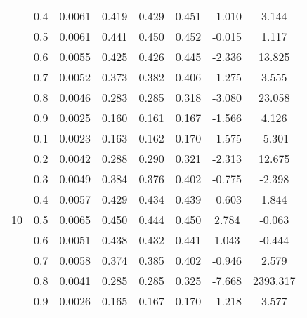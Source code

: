 \documentclass[11pt,a4paper]{report}
\begin{document}
\begin{longtable}{ | c | c || c | c | c | c | c | c | }
 & 0.4 & 0.0061 & 0.419 & 0.429 & 0.451 & -1.010 & 3.144 \\
 & 0.5 & 0.0061 & 0.441 & 0.450 & 0.452 & -0.015 & 1.117 \\
 & 0.6 & 0.0055 & 0.425 & 0.426 & 0.445 & -2.336 & 13.825 \\
 & 0.7 & 0.0052 & 0.373 & 0.382 & 0.406 & -1.275 & 3.555 \\
 & 0.8 & 0.0046 & 0.283 & 0.285 & 0.318 & -3.080 & 23.058 \\
 & 0.9 & 0.0025 & 0.160 & 0.161 & 0.167 & -1.566 & 4.126 \\
 \hline
\multirow{9}{*}{10} & 0.1 & 0.0023 & 0.163 & 0.162 & 0.170 & -1.575 & -5.301 \\
 & 0.2 & 0.0042 & 0.288 & 0.290 & 0.321 & -2.313 & 12.675 \\
 & 0.3 & 0.0049 & 0.384 & 0.376 & 0.402 & -0.775 & -2.398 \\
 & 0.4 & 0.0057 & 0.429 & 0.434 & 0.439 & -0.603 & 1.844 \\
 & 0.5 & 0.0065 & 0.450 & 0.444 & 0.450 & 2.784 & -0.063 \\
 & 0.6 & 0.0051 & 0.438 & 0.432 & 0.441 & 1.043 & -0.444 \\
 & 0.7 & 0.0058 & 0.374 & 0.385 & 0.402 & -0.946 & 2.579 \\
 & 0.8 & 0.0041 & 0.285 & 0.285 & 0.325 & -7.668 & 2393.317 \\
 & 0.9 & 0.0026 & 0.165 & 0.167 & 0.170 & -1.218 & 3.577 \\
 \hline
\hline
\end{longtable}
\end{document}

